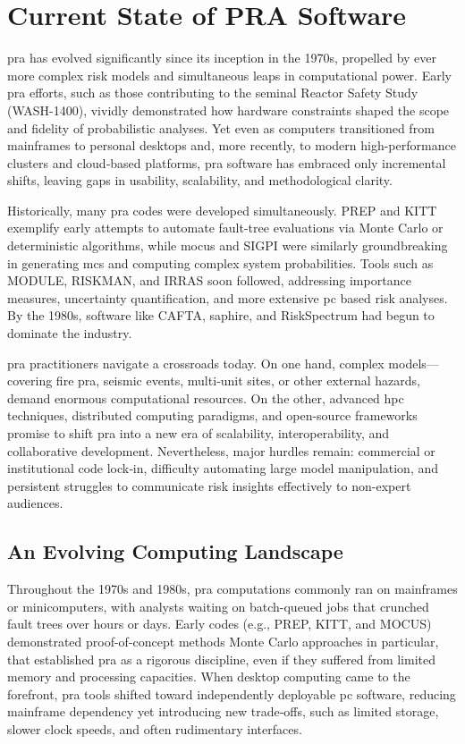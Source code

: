 \chapter{Current State of PRA Software}
\acrfull{pra} has evolved significantly since its inception in the 1970s, propelled by ever more complex risk models and simultaneous leaps in computational power. Early \acrshort{pra} efforts, such as those contributing to the seminal Reactor Safety Study (WASH-1400), vividly demonstrated how hardware constraints shaped the scope and fidelity of probabilistic analyses. Yet even as computers transitioned from mainframes to personal desktops and, more recently, to modern high-performance clusters and cloud‐based platforms, \acrshort{pra} software has embraced only incremental shifts, leaving gaps in usability, scalability, and methodological clarity.

Historically, many \acrshort{pra} codes were developed simultaneously. PREP and KITT exemplify early attempts to automate fault-tree evaluations via Monte Carlo or deterministic algorithms, while \acrshort{mocus} and SIGPI were similarly groundbreaking in generating \acrfull{mcs} and computing complex system probabilities. Tools such as MODULE, RISKMAN, and IRRAS soon followed, addressing importance measures, uncertainty quantification, and more extensive \acrfull{pc} based risk analyses. By the 1980s, software like CAFTA, \acrshort{saphire}, and RiskSpectrum had begun to dominate the industry.

\acrshort{pra} practitioners navigate a crossroads today. On one hand, complex models—covering fire \acrshort{pra}, seismic events, multi‐unit sites, or other external hazards, demand enormous computational resources. On the other, advanced \acrfull{hpc} techniques, distributed computing paradigms, and open-source frameworks promise to shift \acrshort{pra} into a new era of scalability, interoperability, and collaborative development. Nevertheless, major hurdles remain: commercial or institutional code lock‐in, difficulty automating large model manipulation, and persistent struggles to communicate risk insights effectively to non-expert audiences.




\section{An Evolving Computing Landscape}

Throughout the 1970s and 1980s, \acrshort{pra} computations commonly ran on mainframes or minicomputers, with analysts waiting on batch-queued jobs that crunched fault trees over hours or days. Early codes (e.g., PREP, KITT, and MOCUS) demonstrated proof-of-concept methods Monte Carlo approaches in particular, that established \acrshort{pra} as a rigorous discipline, even if they suffered from limited memory and processing capacities. When desktop computing came to the forefront, \acrshort{pra} tools shifted toward independently deployable \acrshort{pc} software, reducing mainframe dependency yet introducing new trade‐offs, such as limited storage, slower clock speeds, and often rudimentary interfaces.

